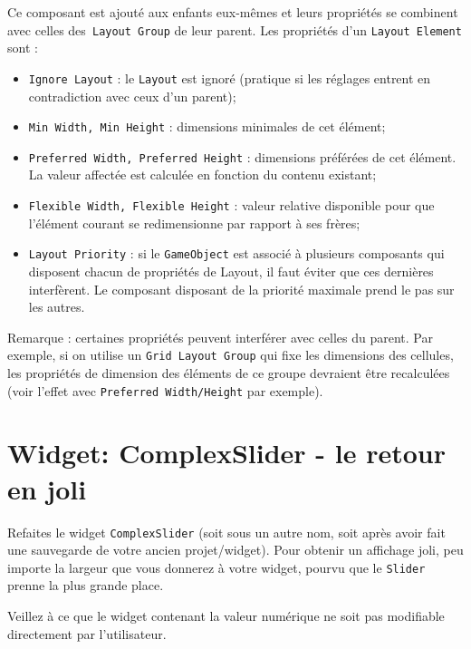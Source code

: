 \documentclass[a4paper,10pt]{article}
\newenvironment{solution}%
{\begin{tcolorbox}[breakable,colback=red!5!white,colframe=red!75!black,title=Solution]}%
{\end{tcolorbox}}
\begin{document}
\begin{enumerate}
\begin{solution}
Ce composant est ajouté aux enfants eux-mêmes et leurs propriétés se combinent avec celles des\texttt{ Layout Group} de leur parent. Les propriétés d'un \texttt{Layout Element} sont : 
\begin{itemize}
	\item \texttt{Ignore Layout} : le \texttt{Layout} est ignoré (pratique si les réglages entrent en contradiction avec ceux d'un parent);
	\item \texttt{Min Width, Min Height} : dimensions minimales de cet élément;
	\item \texttt{Preferred Width, Preferred Height} : dimensions préférées de cet élément. La valeur affectée est calculée en fonction du contenu existant;
	\item \texttt{Flexible Width, Flexible Height} : valeur relative disponible pour que l'élément courant se redimensionne par rapport à ses frères;
	\item  \texttt{Layout Priority} : si le \texttt{GameObject} est associé à plusieurs composants qui disposent chacun de propriétés de Layout, il faut éviter que ces dernières interfèrent. Le composant disposant de la priorité maximale prend le pas sur les autres.	
\end{itemize}

Remarque : certaines propriétés peuvent interférer avec celles du parent. Par exemple, si on utilise un \texttt{Grid Layout Group} qui fixe les dimensions des cellules, les propriétés de dimension des éléments de ce groupe devraient être recalculées (voir l'effet avec \texttt{Preferred Width/Height} par exemple).	
\end{solution}
\fi 

	
	
\end{enumerate}

\section{Widget: ComplexSlider - le retour en joli}

Refaites le widget \texttt{ComplexSlider} (soit sous un autre nom, soit après avoir fait une sauvegarde de votre ancien projet/widget). Pour obtenir un affichage joli, peu importe la largeur que vous donnerez à votre widget, pourvu que le \texttt{Slider} prenne la plus grande place.

Veillez à ce que le widget contenant la valeur numérique ne soit pas modifiable directement par l'utilisateur.
\end{document}
